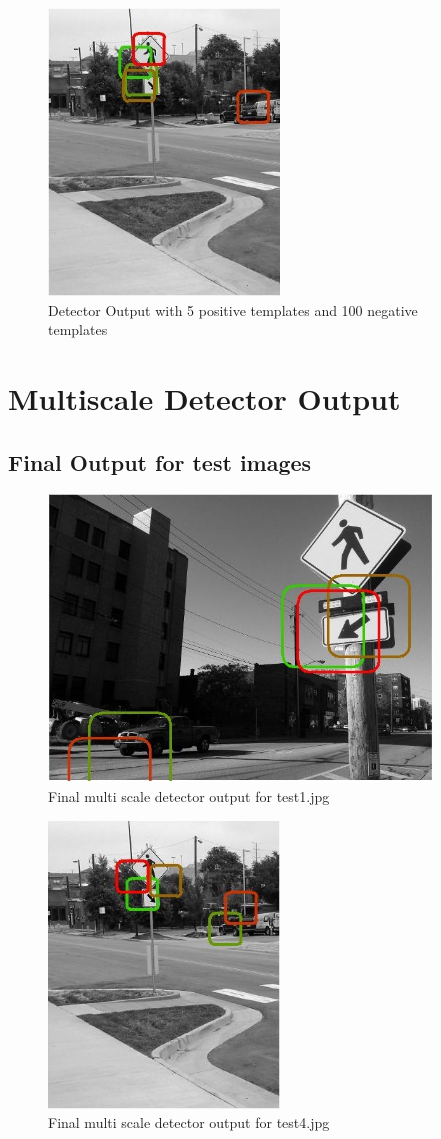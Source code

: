 \documentclass[11pt,psfig]{article}
\begin{document}
\begin{figure}[H]
\centering
\includegraphics[height=3in]{prob5_a3plot2.jpg}
\caption{Detector Output with 5 positive templates and 100 negative templates}
\end{figure}

\section*{Multiscale Detector Output}

\subsection*{Final Output for test images}

\begin{figure}[H]
\centering
\includegraphics[height=3in]{prob5b_plot1.jpg}
\caption{Final multi scale detector output for test1.jpg}
\end{figure}

\begin{figure}[H]
\centering
\includegraphics[height=3in]{prob5b_plot2.jpg}
\caption{Final multi scale detector output for test4.jpg}
\end{figure}
\end{document}
